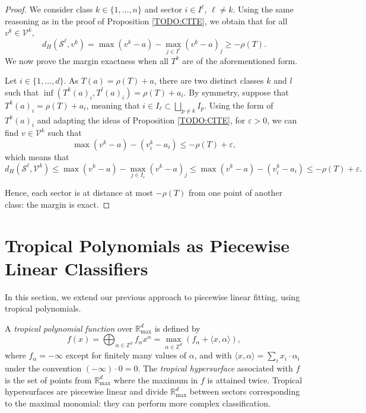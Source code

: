 \documentclass[oneside,english,a4paper]{amsart}
\numberwithin{equation}{section}
\numberwithin{figure}{section}
\theoremstyle{plain}
\theoremstyle{definition}
\theoremstyle{plain}
\theoremstyle{remark}
\theoremstyle{plain}
\theoremstyle{definition}
\theoremstyle{definition}
\begin{document}
\begin{proof}
We consider class $k\in\{1,\ldots, n\}$ and sector $i\in I^\ell$, $\ell \ne k$. Using the same reasoning
as in the proof of Proposition \ref{TODO:CITE}, we obtain that for all $v^{k}\in \mathcal{V}^{k}$,
\[
d_H(\mathcal{S}^\ell,v^{k})=\max(v^{k}-a)-\max_{j\in I^{\ell}}(v^{k}-a)_j\ge-\rho(T).
\]
We now prove the margin exactness when all $T^{k}$ are of the aforementioned form. 

Let $i\in\{1,\ldots, d\}$. As $T(a)=\rho(T)+a$, there are two distinct classes $k$ and $l$ such that  $\inf(T^{k}(a)_{i}, T^{l}(a)_{i})=\rho(T)+a_{i}$. By symmetry, suppose that $T^k(a)_i=\rho(T)+a_i$, meaning that $i\in I_\ell \subset \bigsqcup_{p\ne k} I_p$. Using the form of $T^k(a)_i$ and adapting the ideas of Proposition \ref{TODO:CITE}, for $\varepsilon > 0$, we can find $v\in \mathcal{V}^k$ such that $$\max(v^{k}-a)-(v_{i}^{k}-a_{i})\le-\rho(T)+\varepsilon,$$ which means that 
\[
d_H(\mathcal{S}^\ell,\mathcal{V}^{k})\le \max(v^{k}-a)-\max_{j\in I_\ell}(v^{k}-a)_j \le \max(v^{k}-a) - (v^{k}_i - a_i) \le -\rho(T)+\varepsilon.
\]

Hence, each sector is at distance at most $-\rho(T)$ from one point of another class: the margin is exact.
\end{proof}

\section{Tropical Polynomials as Piecewise Linear Classifiers}

In this section, we extend our previous approach to piecewise linear
fitting, using tropical polynomials. 

A \emph{tropical polynomial} \emph{function} over $\mathbb{R}_{\max}^{d}$
is defined by
\[
f(x)=\bigoplus_{\alpha\in\mathbb{Z}^{d}}f_{\alpha}x^{\alpha}=\max_{\alpha\in\mathbb{Z}^{d}}\left(f_{\alpha}+\langle x,\alpha\rangle\right),
\]
where $f_{\alpha}=-\infty$ except for finitely many values of $\alpha$,
and with $\langle x,\alpha\rangle=\sum_{i}x_{i}\cdot\alpha_{i}$ under
the convention $(-\infty)\cdot0=0$. The \emph{tropical hypersurface} associated with $f$ is the set of points from
$\mathbb{R}_{\max}^{d}$ where the maximum in $f$ is attained twice.
Tropical hypersurfaces are piecewise linear and divide $\mathbb{R}_{\max}^{d}$
between sectors corresponding to the maximal monomial: they can perform
more complex classification.
\end{document}

